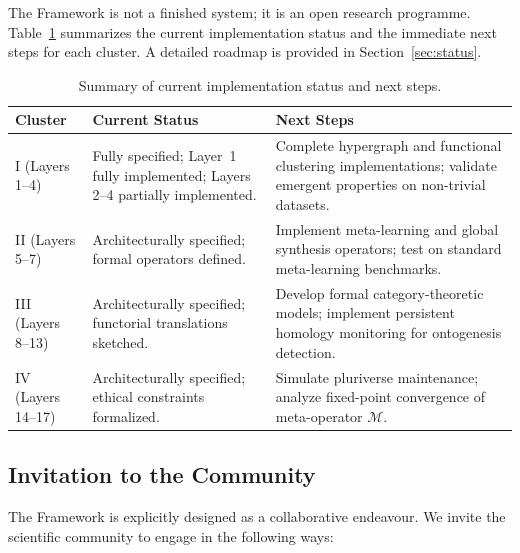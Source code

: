 The \Apeiron{} Framework is not a finished system; it is an open research programme. Table~\ref{tab:status_summary} summarizes the current implementation status and the immediate next steps for each cluster. A detailed roadmap is provided in Section~\ref{sec:status}.

\begin{table}[htbp]
\centering
\caption{Summary of current implementation status and next steps.}
\label{tab:status_summary}
\begin{tabular}{p{} p{} p{}}
\toprule
\textbf{Cluster} & \textbf{Current Status} & \textbf{Next Steps} \\
\midrule
I (Layers 1--4) & Fully specified; Layer~1 fully implemented; Layers 2--4 partially implemented. & Complete hypergraph and functional clustering implementations; validate emergent properties on non-trivial datasets. \\
II (Layers 5--7) & Architecturally specified; formal operators defined. & Implement meta-learning and global synthesis operators; test on standard meta-learning benchmarks. \\
III (Layers 8--13) & Architecturally specified; functorial translations sketched. & Develop formal category-theoretic models; implement persistent homology monitoring for ontogenesis detection. \\
IV (Layers 14--17) & Architecturally specified; ethical constraints formalized. & Simulate pluriverse maintenance; analyze fixed-point convergence of meta-operator $\mathcal{M}$. \\
\bottomrule
\end{tabular}
\end{table}

\subsection*{Invitation to the Community}

The \Apeiron{} Framework is explicitly designed as a collaborative endeavour. We invite the scientific community to engage in the following ways:

